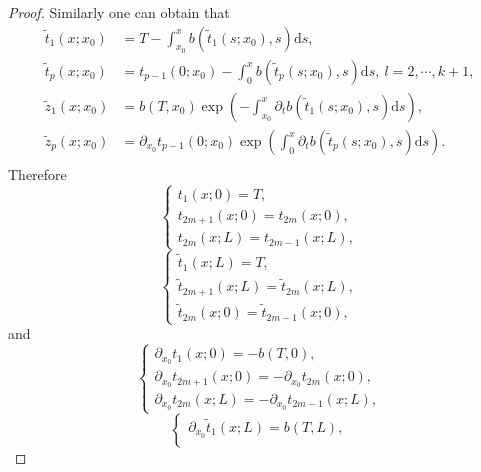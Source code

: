 \documentclass[a4paper,reqno,11pt]{amsart}
\numberwithin{equation}{section} %
\begin{document}
\begin{proof}
Similarly one can obtain that
$$
\begin{aligned}
	\tilde{t}  _1 \left( x;x_0 \right) &=T-\int_{x_0}^x b\left( \tilde{t}  _1 \left( s;x_0 \right) ,s \right) \text{d}s ,\\
    \tilde{t} _p \left( x;x_0 \right) &=t _{p-1} \left( 0;x_0 \right)-\int_{0}^x b\left( \tilde{t} _p \left( s;x_0 \right) ,s \right) \text{d}s ,\ l=2 , \cdots , k+1 ,\\
	\tilde{z} _1 \left( x;x_0 \right) &=b\left( T,x_0 \right) \exp \left(  -\int_{x_0}^x{\partial _t}b\left(\tilde{ t} _1 \left( s;x_0 \right) ,s \right) \text{d}s \right), \\
	\tilde{z} _p \left( x;x_0 \right) &=\partial _{x_0} t _{p-1} \left( 0;x_0 \right) \exp \left(  \int_{0}^x{\partial _t}b\left( \tilde{t} _p \left( s;x_0 \right) ,s \right) \text{d}s \right).\\
\end{aligned}
$$
Therefore
\begin{equation}\label{29}
    \left\{ \begin{array}{l}
		t_{1}(x;0) =T,\\
        t_{2m+1}(x;0) = t_{2m}(x;0) ,\\
        t_{2m}(x;L) = t_{2m - 1}(x;L) ,
    \end{array} \right. 
    \end{equation}
\begin{equation}\label{210}
    \left\{ \begin{array}{l}
		\tilde{t} _{1}(x;L) =T,\\
        \tilde{t} _{2m+1}(x;L) = \tilde{t} _{2m}(x;L) ,\\
        \tilde{t} _{2m}(x;0) = \tilde{t} _{2m - 1}(x;0) ,
    \end{array} \right. 
    \end{equation}
and
\begin{equation}\label{211}
    \left\{ \begin{array}{l}
		\partial _{x_0} t_{1}(x;0) = -b(T,0),\\
        \partial _{x_0} t_{2m+1}(x;0) = -\partial _{x_0} t_{2m}(x;0) ,\\
        \partial _{x_0} t_{2m}(x;L) = -\partial _{x_0} t_{2m - 1}(x;L) ,
    \end{array} \right. 
    \end{equation}
\begin{equation}\label{212}
    \left\{ \begin{array}{l}
		\partial _{x_0} \tilde{t} _{1}(x;L) = b(T,L),\\

\end{array}
\end{equation}
\end{proof}
\end{document}
